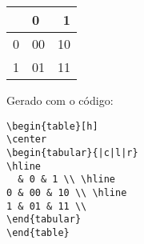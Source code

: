 \begin{table}[h]
\center
\begin{tabular}{|c|l|r}
\hline
  & 0 & 1 \\ \hline
0 & 00 & 10 \\ \hline
1 & 01 & 11 \\ 
\end{tabular}
\end{table}

Gerado com o código:
\begin{verbatim}
\begin{table}[h]
\center
\begin{tabular}{|c|l|r}
\hline
  & 0 & 1 \\ \hline
0 & 00 & 10 \\ \hline
1 & 01 & 11 \\ 
\end{tabular}
\end{table}
\end{verbatim}




